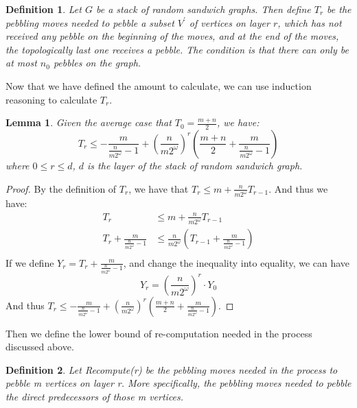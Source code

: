 \documentclass[a4paper, oneside]{article}
\newtheorem{lemma}{Lemma}
\newtheorem{definition}{Definition}
\begin{document}
\begin{definition}
  Let $G$ be a stack of random sandwich graphs. Then define $T_r$ be the pebbling moves needed to pebble a subset $V^\prime$ of vertices on layer $r$, which has
  not received any pebble on the beginning of the moves, and at the end of the moves, the topologically last one receives a pebble. The condition is that there
  can only be at most $n_0$ pebbles on the graph.
\end{definition}

Now that we have defined the amount to calculate, we can use induction reasoning to calculate $T_r$.

\begin{lemma}\label{lemma::rbound}
  Given the average case that $T_0 = \frac{m+n}{2}$, we have:
  \begin{equation}
    T_r \leq -\frac{m}{\frac{n}{m2^\omega} - 1} + (\frac{n}{m2^\omega})^r(\frac{m+n}{2}+\frac{m}{\frac{n}{m2^\omega} - 1})
  \end{equation}
  where $0 \leq r \leq d$, $d$ is the layer of the stack of random sandwich graph.
\end{lemma}
\begin{proof}
  By the definition of $T_r$, we have that $T_r \leq m + \frac{n}{m2^\omega}T_{r-1}$. And thus we have:
  \begin{align}
    T_r &\leq m + \frac{n}{m2^\omega}T_{r-1}\\
    T_r + \frac{m}{\frac{n}{m2^\omega} - 1} &\leq \frac{n}{m2^\omega}(T_{r-1} + \frac{m}{\frac{n}{m2^\omega} - 1})\\
  \end{align}
  If we define $Y_r = T_r + \frac{m}{\frac{n}{m2^\omega} - 1}$, and change the inequality into equality, we can have
  \begin{equation}
    Y_r = (\frac{n}{m2^\omega})^r \cdot Y_0
  \end{equation}
  And thus $T_r \leq -\frac{m}{\frac{n}{m2^\omega} - 1} + (\frac{n}{m2^\omega})^r(\frac{m+n}{2}+\frac{m}{\frac{n}{m2^\omega} - 1})$.
\end{proof}

Then we define the lower bound of re-computation needed in the process discussed above.
\begin{definition}
  Let Recompute(r) be the pebbling moves needed in the process to pebble m vertices on layer r. More specifically, the pebbling moves needed to
  pebble the direct predecessors of those m vertices.
\end{definition}
\end{document}
